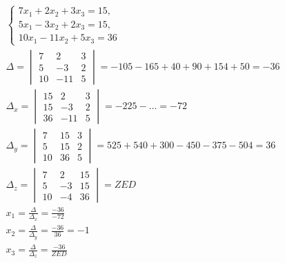 \documentclass[a4paper, 11pt, oneside]{article}
\begin{document}
\begin{gather*}
	\begin{cases}
		7x_1+2x_2+3x_3=15,\\
		5x_1-3x_2+2x_3=15,\\
		10x_1-11x_2+5x_3=36
	\end{cases}\\
	\varDelta =
	\begin{vmatrix}
		7& 2& 3\\
		5& -3& 2\\
		10& -11& 5
	\end{vmatrix}=-105-165+40+90+154+50=-36\\
	\varDelta_{x} =
	\begin{vmatrix}
		15& 2& 3\\
		15& -3& 2\\
		36& -11& 5
	\end{vmatrix}=-225-\dots=-72\\
	\varDelta_{y} =
	\begin{vmatrix}
		7& 15& 3\\
		5& 15& 2\\
		10& 36& 5
	\end{vmatrix}=525+540+300-450-375-504=36\\
	\varDelta_{z} =
	\begin{vmatrix}
		7& 2& 15\\
		5& -3& 15\\
		10& -4& 36
	\end{vmatrix}=ZED\\
	x_1=\frac{\varDelta}{\varDelta_x}=\frac{-36}{-72}\\
	x_2=\frac{\varDelta}{\varDelta_y}=\frac{-36}{36}=-1\\
	x_3=\frac{\varDelta}{\varDelta_z}=\frac{-36}{ZED}\\
\end{gather*}
\end{document}
